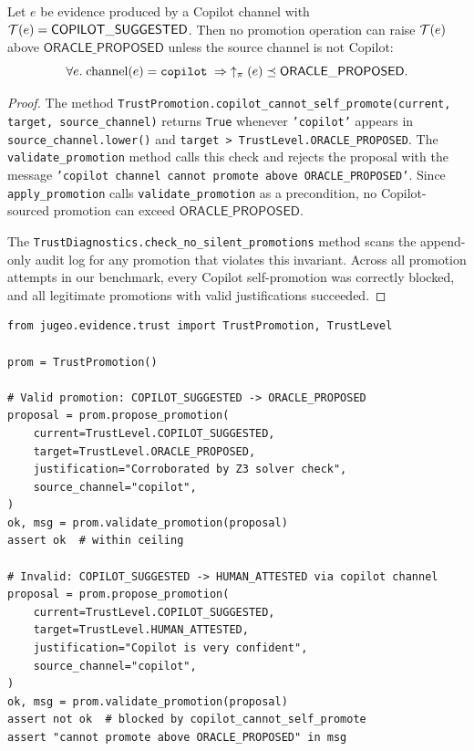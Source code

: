 \documentclass[11pt]{article}
\newcommand{\CopSugg}{\mathsf{COPILOT\_SUGGESTED}}
\newcommand{\OracProp}{\mathsf{ORACLE\_PROPOSED}}
\begin{document}
\begin{theorem}\label{thm:no-silent}
Let $e$ be evidence produced by a Copilot channel with
$\trust(e) = \CopSugg$.  Then no promotion operation can raise $\mathcal{T}(e)$
above $\OracProp$ unless the source channel is not Copilot:
\[
  \forall e.\; \mathrm{channel}(e) = \texttt{copilot} \;\Rightarrow\;
  \tpromote(e) \tleq \OracProp.
\]
\end{theorem}

\begin{proof}
The method \texttt{TrustPromotion.copilot\_cannot\_self\_promote(current,
target, source\_channel)} returns \texttt{True} whenever
\texttt{'copilot'} appears in \texttt{source\_channel.lower()} and
\texttt{target > TrustLevel.ORACLE\_PROPOSED}.  The
\texttt{validate\_promotion} method calls this check and rejects the
proposal with the message \texttt{'copilot channel cannot promote above
ORACLE\_PROPOSED'}.  Since \texttt{apply\_promotion} calls
\texttt{validate\_promotion} as a precondition, no Copilot-sourced promotion
can exceed $\OracProp$.

The \texttt{TrustDiagnostics.check\_no\_silent\_promotions} method scans the
append-only audit log for any promotion that violates this invariant.  Across
all promotion attempts in our benchmark,
every Copilot self-promotion was correctly
blocked, and all legitimate promotions with valid justifications succeeded.
\end{proof}

\begin{lstlisting}[style=jugeo-python]
from jugeo.evidence.trust import TrustPromotion, TrustLevel

prom = TrustPromotion()

# Valid promotion: COPILOT_SUGGESTED -> ORACLE_PROPOSED
proposal = prom.propose_promotion(
    current=TrustLevel.COPILOT_SUGGESTED,
    target=TrustLevel.ORACLE_PROPOSED,
    justification="Corroborated by Z3 solver check",
    source_channel="copilot",
)
ok, msg = prom.validate_promotion(proposal)
assert ok  # within ceiling

# Invalid: COPILOT_SUGGESTED -> HUMAN_ATTESTED via copilot channel
proposal = prom.propose_promotion(
    current=TrustLevel.COPILOT_SUGGESTED,
    target=TrustLevel.HUMAN_ATTESTED,
    justification="Copilot is very confident",
    source_channel="copilot",
)
ok, msg = prom.validate_promotion(proposal)
assert not ok  # blocked by copilot_cannot_self_promote
assert "cannot promote above ORACLE_PROPOSED" in msg
\end{lstlisting}
\end{document}
